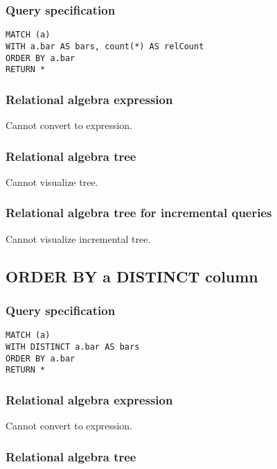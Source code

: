 \subsubsection*{Query specification}

\begin{lstlisting}
MATCH (a)
WITH a.bar AS bars, count(*) AS relCount
ORDER BY a.bar
RETURN *
\end{lstlisting}

\subsubsection*{Relational algebra expression}

Cannot convert to expression.

\subsubsection*{Relational algebra tree}

Cannot visualize tree.

\subsubsection*{Relational algebra tree for incremental queries}

Cannot visualize incremental tree.

\subsection{ORDER BY a DISTINCT column}

\subsubsection*{Query specification}

\begin{lstlisting}
MATCH (a)
WITH DISTINCT a.bar AS bars
ORDER BY a.bar
RETURN *
\end{lstlisting}

\subsubsection*{Relational algebra expression}

Cannot convert to expression.

\subsubsection*{Relational algebra tree}

